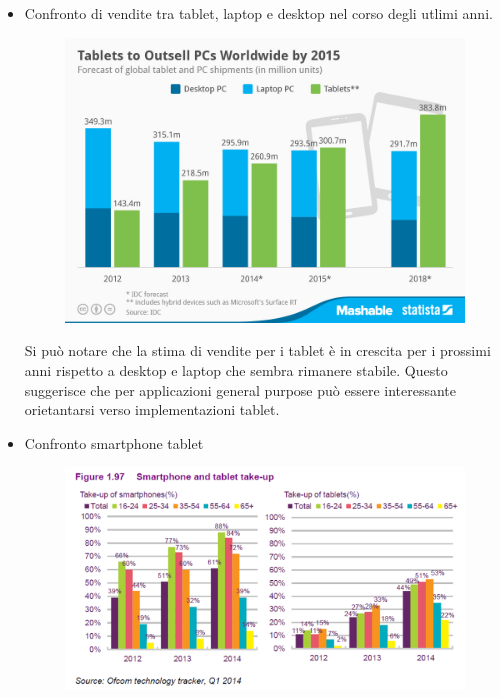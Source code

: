 \begin{itemize}
\item Confronto di vendite tra tablet, laptop e desktop nel corso degli utlimi
anni.

\begin{figure} [H]
	\centering
	\includegraphics[scale=0.3]{img/Pew-Dems-of-Tablet-Users.jpg}
\end{figure}
Si può notare che la stima di vendite per i tablet è in crescita per i
prossimi anni rispetto a desktop e laptop che sembra rimanere stabile.
Questo suggerisce che per applicazioni general purpose può essere
interessante orietantarsi verso implementazioni tablet.

\item Confronto smartphone tablet
\begin{figure}[H]
	\centering
	\includegraphics[scale=0.5]{img/Smartphone_Tablet_Age.png}
\end{figure}
\end{itemize}

